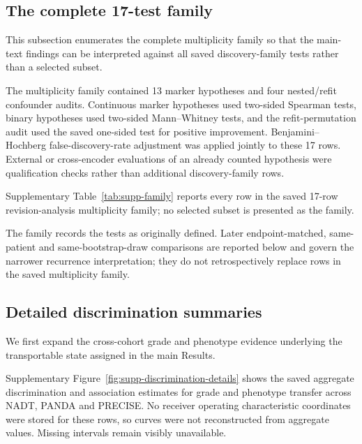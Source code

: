 \subsection*{The complete 17-test family}

This subsection enumerates the complete multiplicity family so that the main-text findings
can be interpreted against all saved discovery-family tests rather than a selected subset.

The multiplicity family contained 13 marker hypotheses and four nested/refit confounder
audits. Continuous marker hypotheses used two-sided Spearman tests, binary hypotheses used
two-sided Mann--Whitney tests, and the refit-permutation audit used the saved one-sided
test for positive improvement. Benjamini--Hochberg false-discovery-rate adjustment was applied
jointly to these 17 rows. External or cross-encoder evaluations of an already counted
hypothesis were qualification checks rather than additional discovery-family rows.



Supplementary Table~\ref{tab:supp-family} reports every row in the saved 17-row
revision-analysis multiplicity family; no selected subset is presented as the family.

The family records the tests as originally defined. Later endpoint-matched, same-patient
and same-bootstrap-draw comparisons are reported below and govern the narrower recurrence
interpretation; they do not retrospectively replace rows in the saved multiplicity family.

\subsection*{Detailed discrimination summaries}

We first expand the cross-cohort grade and phenotype evidence underlying the transportable
state assigned in the main Results.

Supplementary Figure~\ref{fig:supp-discrimination-details} shows the saved aggregate
discrimination and association estimates for grade and phenotype transfer across NADT,
PANDA and PRECISE. No
receiver operating characteristic coordinates were stored for these rows, so curves were
not reconstructed from aggregate values. Missing intervals remain visibly unavailable.


